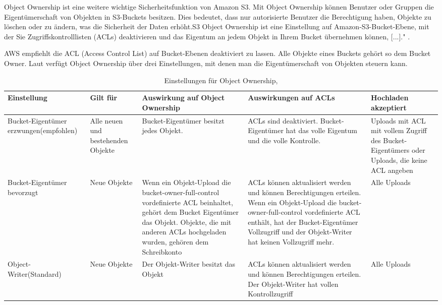 Object Ownership ist eine weitere wichtige Sicherheitsfunktion von Amazon S3. Mit Object Ownership können Benutzer oder Gruppen die Eigentümerschaft von Objekten in S3-Buckets besitzen. Dies bedeutet, dass nur autorisierte Benutzer die Berechtigung haben, Objekte zu löschen oder zu ändern, was die Sicherheit der Daten erhöht.\glqq S3 Object Ownership ist eine Einstellung auf Amazon-S3-Bucket-Ebene, mit der Sie Zugriffskontrolllisten (ACLs) deaktivieren und das Eigentum an jedem Objekt in Ihrem Bucket übernehmen können, [...]." \cite{aws-iam-s3}.

\newpage

AWS empfiehlt die ACL (Access Control List) auf Bucket-Ebenen deaktiviert zu lassen. Alle Objekte eines Buckets gehört so dem Bucket Owner. Laut \citeauthor{aws-iam-s3} verfügt Object Ownership über drei Einstellungen, mit denen man die Eigentümerschaft von Objekten steuern kann.

\begin{table}[!h]
\begin{tabular}{ |p{2cm}|p{2cm}|p{3cm}|p{3cm}|p{2.5cm}| }
\hline
\textbf{Einstellung} & \textbf{Gilt für} & \textbf{Auswirkung auf Object Ownership} & \textbf{Auswirkungen auf ACLs} & \textbf{Hochladen akzeptiert} \\
\hline
Bucket-Eigentümer erzwungen(empfohlen) & Alle neuen und bestehenden Objekte & Bucket-Eigentümer besitzt jedes Objekt. & ACLs sind deaktiviert. Bucket-Eigentümer hat das volle Eigentum und die volle Kontrolle. & Uploads mit ACL mit vollem Zugriff des Bucket-Eigentümers oder Uploads, die keine ACL angeben \\
\hline
Bucket-Eigentümer bevorzugt & Neue Objekte   & Wenn ein Objekt-Upload die bucket-owner-full-control vordefinierte ACL beinhaltet, gehört dem Bucket Eigentümer das Objekt. Objekte, die mit anderen ACLs hochgeladen wurden, gehören dem Schreibkonto & ACLs können aktualisiert werden und können Berechtigungen erteilen. Wenn ein Objekt-Upload die bucket-owner-full-control vordefinierte ACL enthält, hat der Bucket-Eigentümer Vollzugriff und der Objekt-Writer hat keinen Vollzugriff mehr. & Alle Uploads \\
\hline
Object-Writer(Standard) & Neue Objekte & Der Objekt-Writer besitzt das Objekt & ACLs können aktualisiert werden und können Berechtigungen erteilen. Der Objekt-Writer hat vollen Kontrollzugriff & Alle Uploads \\
\hline
\end{tabular}
\caption{Einstellungen für Object Ownership, }
\end{table}


